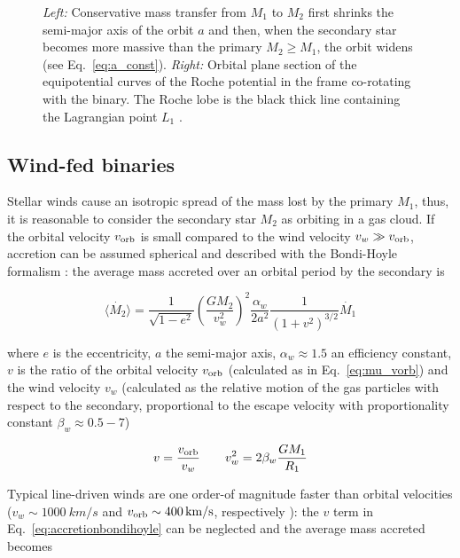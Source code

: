 \documentclass[a4paper,titlepage]{book}     	%
\begin{document}
\begin{figure}[h]
\begin{minipage}{.44\textwidth}
	\end{minipage}
	\caption{\emph{Left:} Conservative mass transfer from $M_1$ to $M_2$ first shrinks the semi-major axis of the orbit $a$ and then, when the secondary star becomes more massive than the primary $M_2 \geq M_1$, the orbit widens (see Eq.\ \ref{eq:a_const}). \emph{Right:} Orbital plane section of the equipotential curves of the Roche potential in the frame co-rotating with the binary. The Roche lobe is the black thick line containing the Lagrangian point $L_1$ \cite{tauris_evo_binaria}.}\label{fig:masstransferRochelobe}
\end{figure}

\subsection{Wind-fed binaries}\label{subsec:windfed}
Stellar winds cause an isotropic spread of the mass lost by the primary $M_1$, thus, it is reasonable to consider the secondary star $M_2$ as orbiting in a gas cloud. If the orbital velocity $v_{\rm orb}$ is small compared to the wind velocity $v_w \gg v_{\rm orb}$, accretion can be assumed spherical and described with the Bondi-Hoyle formalism \cite{BondiHoyle1944}: the average mass accreted over an orbital period by the secondary is

\begin{equation}\label{eq:accretionbondihoyle}
\langle \dot{M_2} \rangle = \frac{1}{\sqrt{1-e^2}} \left(\frac{G M_2}{v_w^2}\right)^2 \frac{\alpha_w}{2 a^2} \frac{1}{\left(1+v^2\right)^{3/2}} \dot{M_1}
\end{equation}

where $e$ is the eccentricity, $a$ the semi-major axis, $\alpha_w \approx 1.5$ an efficiency constant, $v$ is the ratio of the orbital velocity $v_{\rm orb}$ (calculated as in Eq.\ \ref{eq:mu_vorb}) and the wind velocity $v_w$ (calculated as the relative motion of the gas particles with respect to the secondary, proportional to the escape velocity with proportionality constant $\beta_w \approx 0.5-7$)

\begin{equation}
v = \frac{v_\textup{orb}}{v_w} \quad \quad v_w^2=2\beta_w \frac{G M_1}{R_1}
\end{equation}

Typical line-driven winds are one order-of magnitude faster than orbital velocities ($v_w \sim \SI{1000}{km/s}$ and $v_{\rm orb} \sim \SI{400}{km/s}$, respectively \cite{CygX-3_Koljonen2017}): the $v$ term in Eq.\ \ref{eq:accretionbondihoyle} can be neglected and the average mass accreted becomes
\end{document}
